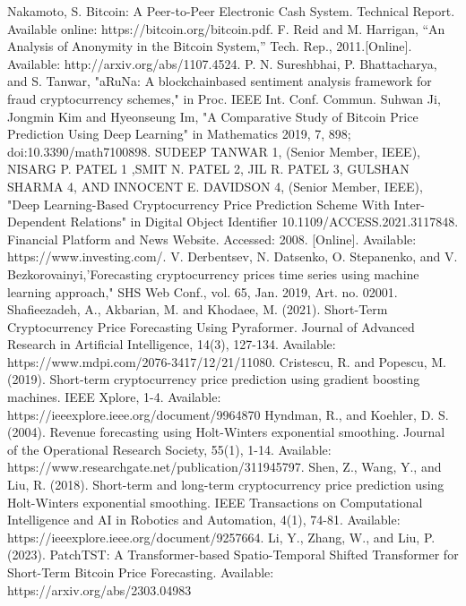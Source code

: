 \documentclass{ieeeojies}
\begin{document}
\begin{thebibliography}{00}
 Nakamoto, S. Bitcoin: A Peer-to-Peer Electronic Cash System. Technical Report. Available online: https://bitcoin.org/bitcoin.pdf.
 F. Reid and M. Harrigan, “An Analysis of Anonymity in the Bitcoin System,” Tech. Rep., 2011.[Online]. Available: http://arxiv.org/abs/1107.4524.
 P. N. Sureshbhai, P. Bhattacharya, and S. Tanwar, "aRuNa: A blockchainbased sentiment analysis framework for fraud cryptocurrency schemes," in Proc. IEEE Int. Conf. Commun. 
 Suhwan Ji, Jongmin Kim and Hyeonseung Im, "A Comparative Study of Bitcoin Price Prediction Using Deep Learning" in Mathematics 2019, 7, 898; doi:10.3390/math7100898.
 SUDEEP TANWAR 1, (Senior Member, IEEE), NISARG P. PATEL 1
,SMIT N. PATEL 2, JIL R. PATEL 3, GULSHAN SHARMA 4, AND INNOCENT E. DAVIDSON 4, (Senior Member, IEEE), "Deep Learning-Based Cryptocurrency
Price Prediction Scheme With Inter-Dependent Relations" in Digital Object Identifier 10.1109/ACCESS.2021.3117848.
 Financial Platform and News Website. Accessed: 2008. [Online]. Available: https://www.investing.com/.
 V. Derbentsev, N. Datsenko, O. Stepanenko, and V. Bezkorovainyi,'Forecasting cryptocurrency prices time series using machine learning approach," SHS Web Conf., vol. 65, Jan. 2019, Art. no. 02001.
 Shafieezadeh, A., Akbarian, M. and Khodaee, M. (2021). Short-Term Cryptocurrency Price Forecasting Using Pyraformer. Journal of Advanced Research in Artificial Intelligence, 14(3), 127-134. Available: https://www.mdpi.com/2076-3417/12/21/11080.
 Cristescu, R. and Popescu, M. (2019). Short-term cryptocurrency price prediction using gradient boosting machines. IEEE Xplore, 1-4. Available: https://ieeexplore.ieee.org/document/9964870
 Hyndman, R., and Koehler, D. S. (2004). Revenue forecasting using Holt-Winters exponential smoothing. Journal of the Operational Research Society, 55(1), 1-14. Available: https://www.researchgate.net/publication/311945797.
 Shen, Z., Wang, Y., and Liu, R. (2018). Short-term and long-term cryptocurrency price prediction using Holt-Winters exponential smoothing. IEEE Transactions on Computational Intelligence and AI in Robotics and Automation, 4(1), 74-81. Available: https://ieeexplore.ieee.org/document/9257664.
 Li, Y., Zhang, W., and Liu, P. (2023). PatchTST: A Transformer-based Spatio-Temporal Shifted Transformer for Short-Term Bitcoin Price Forecasting. Available: https://arxiv.org/abs/2303.04983

\end{thebibliography}


\EOD
\end{document}
